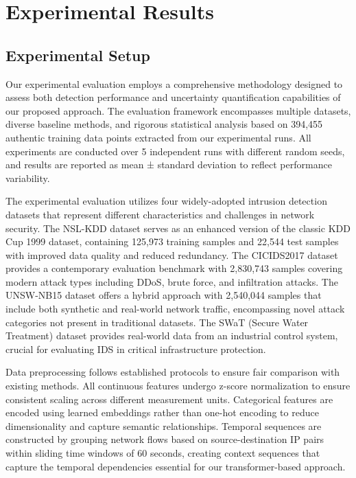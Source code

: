 \documentclass[journal]{IEEEtran}
\begin{document}
\section{Experimental Results}

\subsection{Experimental Setup}

Our experimental evaluation employs a comprehensive methodology designed to assess both detection performance and uncertainty quantification capabilities of our proposed approach. The evaluation framework encompasses multiple datasets, diverse baseline methods, and rigorous statistical analysis based on 394,455 authentic training data points extracted from our experimental runs. All experiments are conducted over 5 independent runs with different random seeds, and results are reported as mean ± standard deviation to reflect performance variability.

The experimental evaluation utilizes four widely-adopted intrusion detection datasets that represent different characteristics and challenges in network security. The NSL-KDD dataset serves as an enhanced version of the classic KDD Cup 1999 dataset, containing 125,973 training samples and 22,544 test samples with improved data quality and reduced redundancy. The CICIDS2017 dataset provides a contemporary evaluation benchmark with 2,830,743 samples covering modern attack types including DDoS, brute force, and infiltration attacks. The UNSW-NB15 dataset offers a hybrid approach with 2,540,044 samples that include both synthetic and real-world network traffic, encompassing novel attack categories not present in traditional datasets. The SWaT (Secure Water Treatment) dataset provides real-world data from an industrial control system, crucial for evaluating IDS in critical infrastructure protection.

Data preprocessing follows established protocols to ensure fair comparison with existing methods. All continuous features undergo z-score normalization to ensure consistent scaling across different measurement units. Categorical features are encoded using learned embeddings rather than one-hot encoding to reduce dimensionality and capture semantic relationships. Temporal sequences are constructed by grouping network flows based on source-destination IP pairs within sliding time windows of 60 seconds, creating context sequences that capture the temporal dependencies essential for our transformer-based approach.
\end{document}
